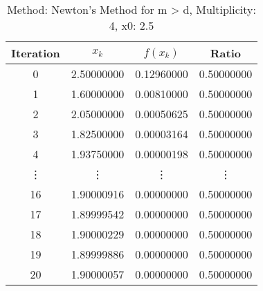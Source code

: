 \begin{table}
\centering
\caption{Method: Newton's Method for m > d, Multiplicity: 4, x0: 2.5}
\label{tab:table_Newton's_Method_for_m_>_d_4_2_5}
\begin{tabular}{c c c c}
\toprule
Iteration &      $x_k$ &   $f(x_k)$ &      Ratio \\
\midrule
        0 & 2.50000000 & 0.12960000 & 0.50000000 \\
        1 & 1.60000000 & 0.00810000 & 0.50000000 \\
        2 & 2.05000000 & 0.00050625 & 0.50000000 \\
        3 & 1.82500000 & 0.00003164 & 0.50000000 \\
        4 & 1.93750000 & 0.00000198 & 0.50000000 \\
   \vdots &     \vdots &     \vdots &     \vdots \\
       16 & 1.90000916 & 0.00000000 & 0.50000000 \\
       17 & 1.89999542 & 0.00000000 & 0.50000000 \\
       18 & 1.90000229 & 0.00000000 & 0.50000000 \\
       19 & 1.89999886 & 0.00000000 & 0.50000000 \\
       20 & 1.90000057 & 0.00000000 & 0.50000000 \\
\bottomrule
\end{tabular}
\end{table}
